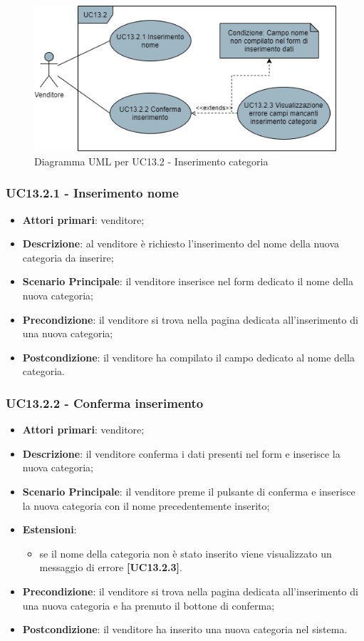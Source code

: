 \begin{figure}[H]
\centering
\includegraphics[scale=0.6]{res/UseCase/Immagini/InserimentoCategoria}
\caption{Diagramma UML per UC13.2 - Inserimento categoria}
\end{figure}

\subsubsection{UC13.2.1 - Inserimento nome}
\begin{itemize}
\item \textbf{Attori primari}: venditore;
\item \textbf{Descrizione}: al venditore è richiesto l'inserimento del nome della nuova categoria da inserire;
\item \textbf{Scenario Principale}: il venditore inserisce nel form dedicato il nome della nuova categoria;
\item \textbf{Precondizione}: il venditore si trova nella pagina dedicata all'inserimento di una nuova categoria;
\item \textbf{Postcondizione}: il venditore ha compilato il campo dedicato al nome della categoria.
\end{itemize}

\subsubsection{UC13.2.2 - Conferma inserimento}
\begin{itemize}
\item \textbf{Attori primari}: venditore;
\item \textbf{Descrizione}: il venditore conferma i dati presenti nel form e inserisce la nuova categoria;
\item \textbf{Scenario Principale}: il venditore preme il pulsante di conferma e inserisce la nuova categoria con il nome precedentemente inserito;
\item \textbf{Estensioni}: 
\begin{itemize}
	\item se il nome della categoria non è stato inserito viene visualizzato un messaggio di errore \textbf{[UC13.2.3]}.
\end{itemize} 
\item \textbf{Precondizione}: il venditore si trova nella pagina dedicata all'inserimento di una nuova categoria e ha premuto il bottone di conferma;
\item \textbf{Postcondizione}: il venditore ha inserito una nuova categoria nel sistema.
\end{itemize}

